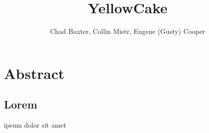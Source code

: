 \documentclass{article}[12pt, a4paper]
\title{YellowCake}
\author{Chad Baxter, Collin Mistr, Eugene (Gusty) Cooper}
\begin{document}
\maketitle
\newpage
\section{Abstract}
\begin{multicols}{2}
  \section{Lorem}
  ipsum dolor sit amet
\end{multicols}


\end{document}
